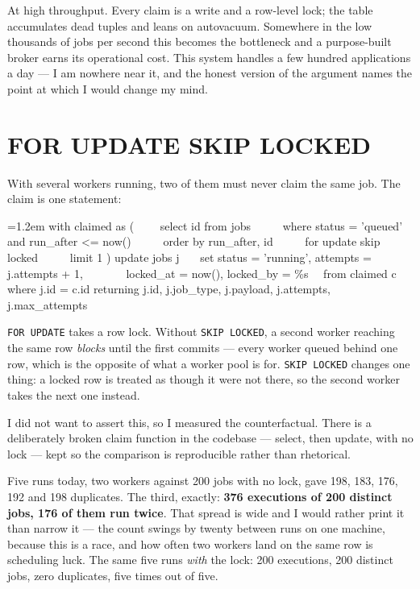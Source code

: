 \documentclass[11pt,a4paper]{article}
\newenvironment{code}%
  {\par\vspace{0.5em}\begingroup\footnotesize\ttfamily\leftskip=1.2em%
   \parskip=0pt\baselineskip=1.05\baselineskip\obeylines}%
  {\endgroup\par\vspace{0.5em}}
\begin{document}
At high throughput. Every claim is a write and a row-level lock; the table
accumulates dead tuples and leans on autovacuum. Somewhere in the low thousands
of jobs per second this becomes the bottleneck and a purpose-built broker earns
its operational cost. This system handles a few hundred applications a day --- I
am nowhere near it, and the honest version of the argument names the point at
which I would change my mind.

\section{FOR UPDATE SKIP LOCKED}

With several workers running, two of them must never claim the same job. The
claim is one statement:

\begin{code}
with claimed as (
~~~~select id from jobs
~~~~~where status = 'queued' and run\_after <= now()
~~~~~order by run\_after, id
~~~~~for update skip locked
~~~~~limit 1
)
update jobs j
~~~set status = 'running', attempts = j.attempts + 1,
~~~~~~~locked\_at = now(), locked\_by = \%s
~~from claimed c where j.id = c.id
returning j.id, j.job\_type, j.payload, j.attempts, j.max\_attempts
\end{code}

\texttt{FOR UPDATE} takes a row lock. Without \texttt{SKIP LOCKED}, a second
worker reaching the same row \emph{blocks} until the first commits --- every
worker queued behind one row, which is the opposite of what a worker pool is
for. \texttt{SKIP LOCKED} changes one thing: a locked row is treated as though
it were not there, so the second worker takes the next one instead.

I did not want to assert this, so I measured the counterfactual. There is a
deliberately broken claim function in the codebase --- select, then update, with
no lock --- kept so the comparison is reproducible rather than rhetorical.

Five runs today, two workers against 200 jobs with no lock, gave 198, 183, 176,
192 and 198 duplicates. The third, exactly: \textbf{376 executions of 200
distinct jobs, 176 of them run twice}. That spread is wide and I would rather
print it than narrow it --- the count swings by twenty between runs on one
machine, because this is a race, and how often two workers land on the same row
is scheduling luck. The same five runs \emph{with} the lock: 200 executions, 200
distinct jobs, zero duplicates, five times out of five.
\end{document}
